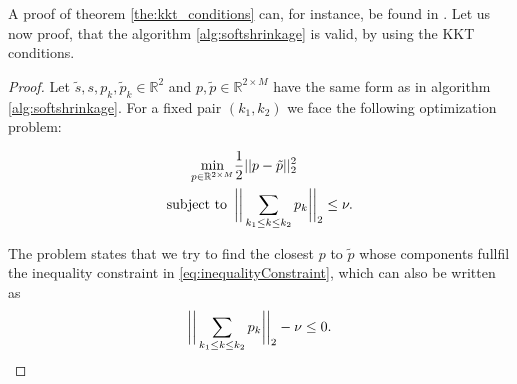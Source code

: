     A proof of theorem \ref{the:kkt_conditions} can, for instance, be found in \cite{Nocedal-Wright}. Let us now proof, that the algorithm \ref{alg:softshrinkage} is valid, by using the KKT conditions.

    \begin{proof}
        Let $\tilde{s}, s, p_{k}, \tilde{p}_{k} \in \mathbb{R}^{2}$ and $p, \tilde{p} \in \mathbb{R}^{2 \times M}$ have the same form as in algorithm \ref{alg:softshrinkage}. For a fixed pair $(k_{1}, k_{2})$ we face the following optimization problem:

        \begin{subequations}
            \begin{align}
            \min\limits_{p \in \mathbb{R}^{2 \times M}} &\frac{1}{2} ||p - \tilde{p}||^{2}_{2} \\
            \textnormal{subject to} \,\,\, &\bigg{|} \bigg{|} \sum_{k_{1} \le k \le k_{2}} p_{k} \bigg{|} \bigg{|}_{2} \le \nu. \label{eq:inequalityConstraint}
            \end{align}
            \label{eq:optimization_problem}
        \end{subequations}

        The problem states that we try to find the closest $p$ to $\tilde{p}$ whose components fullfil the inequality constraint in \ref{eq:inequalityConstraint}, which can also be written as
            $$
                \bigg{|} \bigg{|} \sum_{k_{1} \le k \le k_{2}} p_{k} \bigg{|} \bigg{|}_{2} - \nu \le 0.
            $$



\end{proof}
